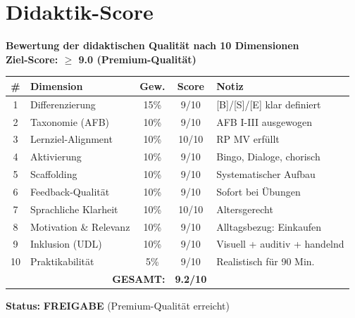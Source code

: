 \documentclass[11pt,a4paper]{article}
\begin{document}
\newpage
\section{Didaktik-Score}

\begin{scorebox}
\textbf{Bewertung der didaktischen Qualität nach 10 Dimensionen}\\
\textbf{Ziel-Score: $\geq$ 9.0 (Premium-Qualität)}

\vspace{1em}
\begin{tabular}{|c|l|c|c|p{4.5cm}|}
\hline
\textbf{\#} & \textbf{Dimension} & \textbf{Gew.} & \textbf{Score} & \textbf{Notiz} \\
\hline
1 & Differenzierung & 15\% & 9/10 & [B]/[S]/[E] klar definiert \\
\hline
2 & Taxonomie (AFB) & 10\% & 9/10 & AFB I-III ausgewogen \\
\hline
3 & Lernziel-Alignment & 10\% & 10/10 & RP MV erfüllt \\
\hline
4 & Aktivierung & 10\% & 9/10 & Bingo, Dialoge, chorisch \\
\hline
5 & Scaffolding & 10\% & 9/10 & Systematischer Aufbau \\
\hline
6 & Feedback-Qualität & 10\% & 9/10 & Sofort bei Übungen \\
\hline
7 & Sprachliche Klarheit & 10\% & 10/10 & Altersgerecht \\
\hline
8 & Motivation \& Relevanz & 10\% & 9/10 & Alltagsbezug: Einkaufen \\
\hline
9 & Inklusion (UDL) & 10\% & 9/10 & Visuell + auditiv + handelnd \\
\hline
10 & Praktikabilität & 5\% & 9/10 & Realistisch für 90 Min. \\
\hline
\multicolumn{3}{|r|}{\textbf{GESAMT:}} & \textbf{9.2/10} & \\
\hline
\end{tabular}

\vspace{1em}
\textbf{Status:} \textcolor{successgreen}{\textbf{FREIGABE}} (Premium-Qualität erreicht)
\end{scorebox}
\end{document}
